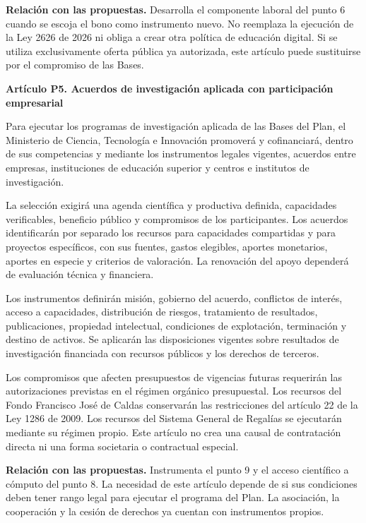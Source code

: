 \textbf{Relación con las propuestas.} Desarrolla el componente laboral del punto 6 cuando se escoja el bono como instrumento nuevo. No reemplaza la ejecución de la Ley 2626 de 2026 ni obliga a crear otra política de educación digital. Si se utiliza exclusivamente oferta pública ya autorizada, este artículo puede sustituirse por el compromiso de las Bases.

\textbf{Artículo P5. Acuerdos de investigación aplicada con participación empresarial}\par\nobreak

Para ejecutar los programas de investigación aplicada de las Bases del Plan, el Ministerio de Ciencia, Tecnología e Innovación promoverá y cofinanciará, dentro de sus competencias y mediante los instrumentos legales vigentes, acuerdos entre empresas, instituciones de educación superior y centros e institutos de investigación.

La selección exigirá una agenda científica y productiva definida, capacidades verificables, beneficio público y compromisos de los participantes. Los acuerdos identificarán por separado los recursos para capacidades compartidas y para proyectos específicos, con sus fuentes, gastos elegibles, aportes monetarios, aportes en especie y criterios de valoración. La renovación del apoyo dependerá de evaluación técnica y financiera.

Los instrumentos definirán misión, gobierno del acuerdo, conflictos de interés, acceso a capacidades, distribución de riesgos, tratamiento de resultados, publicaciones, propiedad intelectual, condiciones de explotación, terminación y destino de activos. Se aplicarán las disposiciones vigentes sobre resultados de investigación financiada con recursos públicos y los derechos de terceros.

Los compromisos que afecten presupuestos de vigencias futuras requerirán las autorizaciones previstas en el régimen orgánico presupuestal. Los recursos del Fondo Francisco José de Caldas conservarán las restricciones del artículo 22 de la Ley 1286 de 2009. Los recursos del Sistema General de Regalías se ejecutarán mediante su régimen propio. Este artículo no crea una causal de contratación directa ni una forma societaria o contractual especial.

\textbf{Relación con las propuestas.} Instrumenta el punto 9 y el acceso científico a cómputo del punto 8. La necesidad de este artículo depende de si sus condiciones deben tener rango legal para ejecutar el programa del Plan. La asociación, la cooperación y la cesión de derechos ya cuentan con instrumentos propios.

